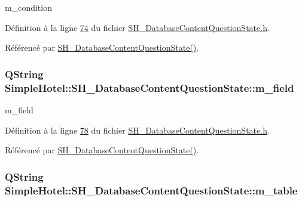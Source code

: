 m\-\_\-condition 



Définition à la ligne \hyperlink{SH__DatabaseContentQuestionState_8h_source_l00074}{74} du fichier \hyperlink{SH__DatabaseContentQuestionState_8h_source}{S\-H\-\_\-\-Database\-Content\-Question\-State.\-h}.



Référencé par \hyperlink{classSimpleHotel_1_1SH__DatabaseContentQuestionState_a91df6c69a129ca799d29610b3332747d}{S\-H\-\_\-\-Database\-Content\-Question\-State()}.

\hypertarget{classSimpleHotel_1_1SH__DatabaseContentQuestionState_ac586a187aa54eb8cc3227688b120d083}{
\subsubsection[{m\-\_\-field}]{\setlength{\rightskip}{0pt plus 5cm}Q\-String Simple\-Hotel\-::\-S\-H\-\_\-\-Database\-Content\-Question\-State\-::m\-\_\-field\hspace{0.3cm}{\ttfamily [private]}}}\label{classSimpleHotel_1_1SH__DatabaseContentQuestionState_ac586a187aa54eb8cc3227688b120d083}


m\-\_\-field 



Définition à la ligne \hyperlink{SH__DatabaseContentQuestionState_8h_source_l00078}{78} du fichier \hyperlink{SH__DatabaseContentQuestionState_8h_source}{S\-H\-\_\-\-Database\-Content\-Question\-State.\-h}.



Référencé par \hyperlink{classSimpleHotel_1_1SH__DatabaseContentQuestionState_a91df6c69a129ca799d29610b3332747d}{S\-H\-\_\-\-Database\-Content\-Question\-State()}.

\hypertarget{classSimpleHotel_1_1SH__DatabaseContentQuestionState_a1cfd629c5c5abe1f349d31861951d8c3}{
\subsubsection[{m\-\_\-table}]{\setlength{\rightskip}{0pt plus 5cm}Q\-String Simple\-Hotel\-::\-S\-H\-\_\-\-Database\-Content\-Question\-State\-::m\-\_\-table\hspace{0.3cm}{\ttfamily [private]}}}\label{classSimpleHotel_1_1SH__DatabaseContentQuestionState_a1cfd629c5c5abe1f349d31861951d8c3}


